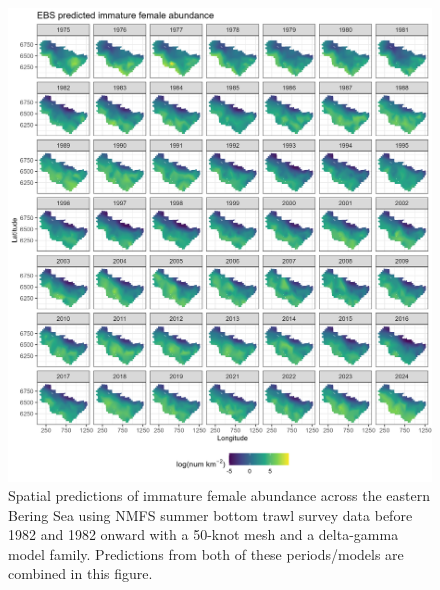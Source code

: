 \documentclass[
]{article}
\begin{document}
\begin{figure}

{\centering \includegraphics[width=1\linewidth,height=1\textheight]{../BAIRDI/Figures/EBS_imfem_spatabund} 

}

\caption{Spatial predictions of immature female abundance across the eastern Bering Sea using NMFS summer bottom trawl survey data before 1982 and 1982 onward with a 50-knot mesh and a delta-gamma model family. Predictions from both of these periods/models are combined in this figure.}\label{fig:spatpred-abund-50-imfem}
\end{figure}
\end{document}
